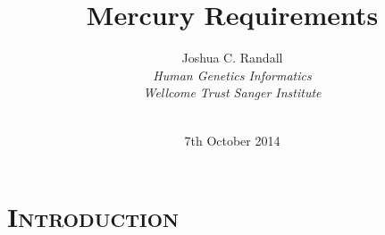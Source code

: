 \documentclass[xcolor=x11names,compress]{beamer}
\makeatletter
\renewcommand{\(}{\begin{columns}}
\renewcommand{\)}{\end{columns}}
\newcommand{\<}[1]{\begin{column}{#1}}
\renewcommand{\>}{\end{column}}
\newenvironment{backgroundblock}[2]{%
  \global\setbox\@backgroundblock=\vbox\bgroup%
    \unvbox\@backgroundblock%
    \vbox to0pt\bgroup\vskip#2\hbox to0pt\bgroup\hskip#1\relax%
}{\egroup\egroup\egroup}
\makeatother
\begin{document}
\section*{\scshape Introduction}
\begin{frame}
\title{Mercury Requirements}
\author{
	Joshua C. Randall \\
	{\it 
	Human Genetics Informatics \\
	Wellcome Trust Sanger Institute 
	}\\
}
\date{
	 \\
	\vspace{0.5cm}
	7th October 2014
}
\titlepage
\end{frame}


\newcommand{\pipesbackground}{
	\begin{backgroundblock}{0cm}{0cm}
		\vbox to \paperheight{\vfil\hbox to \paperwidth{\hfil
		\begin{overpic}[height=0.85\paperheight]{images/Jano_De_Cesare_-_Pipelines_-_by-nc-nd-2_0_-_flickr}
		\put(88,0.5){\textcolor{gray}{\fontsize{4}{6}\selectfont Photo: Jano De Cesare}}
		\end{overpic}
		\hfil\hskip 2mm}\vfil}
	\end{backgroundblock}
}
\end{document}
